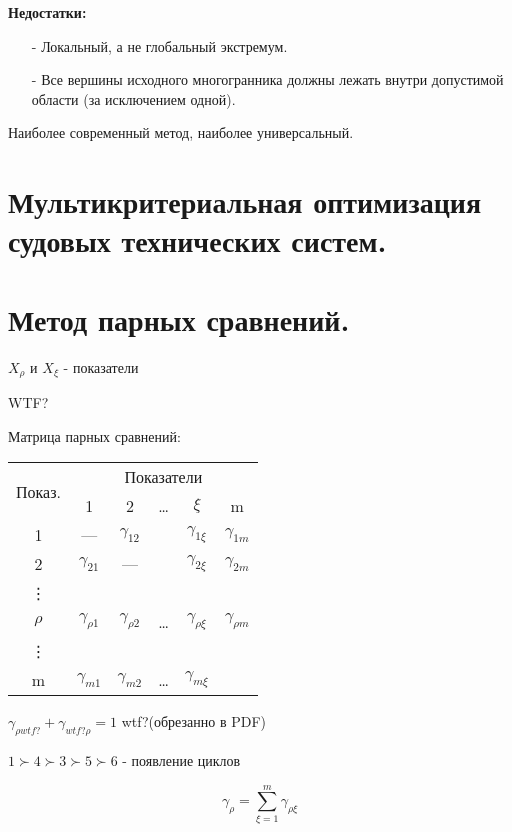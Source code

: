 \documentclass[12pt,a5paper]{scrbook}
\begin{document}
  \textbf{Недостатки:}
  \begin{itemize}
    \item[-] Локальный, а не глобальный экстремум.
    \item[-] Все вершины исходного многогранника должны лежать внутри допустимой области (за исключением одной).
  \end{itemize}
  Наиболее современный метод, наиболее универсальный.
  
  \section{Мультикритериальная оптимизация судовых технических систем.} %
  
  
  \section{Метод парных сравнений.} %

  $X_{\rho}$ и $X_{\xi}$ - показатели

  WTF?

  Матрица парных сравнений:

  \begin{tabular}{|c|c|c|c|c|c|}
    \hline
    \multirow{2}{*}{Показ.} & \multicolumn{5}{c|}{Показатели}\\
    \cline{2-6}
    & 1 & 2 & \dots & $\xi$ & m\\
    \hline
    1 & --- & $\gamma_{12}$ & & $\gamma_{1\xi}$ & $\gamma_{1m}$\\
    \hline
    2 & $\gamma_{21}$ & --- & & $\gamma_{2\xi}$ & $\gamma_{2m}$\\
    \hline
    \vdots & & & & &\\
    \hline
    $\rho$ & $\gamma_{\rho 1}$ & $\gamma_{\rho 2}$ & \dots & $\gamma_{\rho\xi}$ & $\gamma_{\rho m}$\\
    \hline
    \vdots & & & & &\\
    \hline
    m & $\gamma_{m1}$ & $\gamma_{m2}$ & \dots & $\gamma_{m\xi}$ &\\
    \hline
  \end{tabular}

  $\gamma_{\rho wtf?} + \gamma_{wtf?\rho} = 1$ wtf?(обрезанно в PDF)

  $1 \succ 4 \succ 3 \succ 5 \succ 6$ - появление циклов

  $$\gamma_\rho = \sum_{\xi=1}^m\gamma_{\rho\xi}$$
\end{document}
